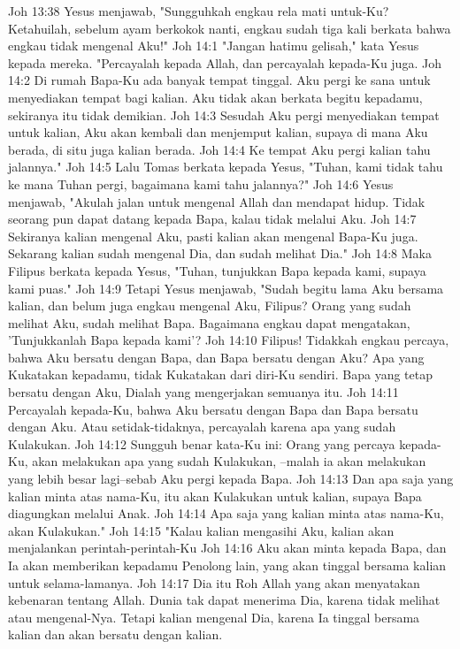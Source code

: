 Joh 13:38  Yesus menjawab, "Sungguhkah engkau rela mati untuk-Ku? Ketahuilah, sebelum ayam berkokok nanti, engkau sudah tiga kali berkata bahwa engkau tidak mengenal Aku!"
Joh 14:1  "Jangan hatimu gelisah," kata Yesus kepada mereka. "Percayalah kepada Allah, dan percayalah kepada-Ku juga.
Joh 14:2  Di rumah Bapa-Ku ada banyak tempat tinggal. Aku pergi ke sana untuk menyediakan tempat bagi kalian. Aku tidak akan berkata begitu kepadamu, sekiranya itu tidak demikian.
Joh 14:3  Sesudah Aku pergi menyediakan tempat untuk kalian, Aku akan kembali dan menjemput kalian, supaya di mana Aku berada, di situ juga kalian berada.
Joh 14:4  Ke tempat Aku pergi kalian tahu jalannya."
Joh 14:5  Lalu Tomas berkata kepada Yesus, "Tuhan, kami tidak tahu ke mana Tuhan pergi, bagaimana kami tahu jalannya?"
Joh 14:6  Yesus menjawab, "Akulah jalan untuk mengenal Allah dan mendapat hidup. Tidak seorang pun dapat datang kepada Bapa, kalau tidak melalui Aku.
Joh 14:7  Sekiranya kalian mengenal Aku, pasti kalian akan mengenal Bapa-Ku juga. Sekarang kalian sudah mengenal Dia, dan sudah melihat Dia."
Joh 14:8  Maka Filipus berkata kepada Yesus, "Tuhan, tunjukkan Bapa kepada kami, supaya kami puas."
Joh 14:9  Tetapi Yesus menjawab, "Sudah begitu lama Aku bersama kalian, dan belum juga engkau mengenal Aku, Filipus? Orang yang sudah melihat Aku, sudah melihat Bapa. Bagaimana engkau dapat mengatakan, 'Tunjukkanlah Bapa kepada kami'?
Joh 14:10  Filipus! Tidakkah engkau percaya, bahwa Aku bersatu dengan Bapa, dan Bapa bersatu dengan Aku? Apa yang Kukatakan kepadamu, tidak Kukatakan dari diri-Ku sendiri. Bapa yang tetap bersatu dengan Aku, Dialah yang mengerjakan semuanya itu.
Joh 14:11  Percayalah kepada-Ku, bahwa Aku bersatu dengan Bapa dan Bapa bersatu dengan Aku. Atau setidak-tidaknya, percayalah karena apa yang sudah Kulakukan.
Joh 14:12  Sungguh benar kata-Ku ini: Orang yang percaya kepada-Ku, akan melakukan apa yang sudah Kulakukan, --malah ia akan melakukan yang lebih besar lagi--sebab Aku pergi kepada Bapa.
Joh 14:13  Dan apa saja yang kalian minta atas nama-Ku, itu akan Kulakukan untuk kalian, supaya Bapa diagungkan melalui Anak.
Joh 14:14  Apa saja yang kalian minta atas nama-Ku, akan Kulakukan."
Joh 14:15  "Kalau kalian mengasihi Aku, kalian akan menjalankan perintah-perintah-Ku
Joh 14:16  Aku akan minta kepada Bapa, dan Ia akan memberikan kepadamu Penolong lain, yang akan tinggal bersama kalian untuk selama-lamanya.
Joh 14:17  Dia itu Roh Allah yang akan menyatakan kebenaran tentang Allah. Dunia tak dapat menerima Dia, karena tidak melihat atau mengenal-Nya. Tetapi kalian mengenal Dia, karena Ia tinggal bersama kalian dan akan bersatu dengan kalian.
